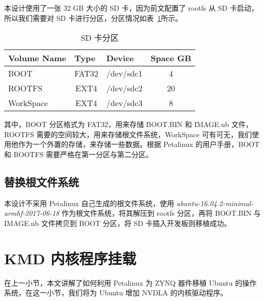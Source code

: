 本设计使用了一张 32 GB 大小的 SD 卡，因为前文配置了 rootfs 从 SD 卡启动，所以我们需要对 SD 卡进行分区，分区情况如表~\ref{tab:SD Card Partition}所示。

\begin{table}[!htbp]
    \caption{SD 卡分区}
    \label{tab:SD Card Partition}
    \centering
    \footnotesize%
    \setlength{\tabcolsep}{4pt}%
    \renewcommand{\arraystretch}{1.2}%
    \begin{tabular}{lccc}
        \toprule
        \textbf{Volume Name} & \multicolumn{1}{l}{\textbf{Type}} & \multicolumn{1}{l}{\textbf{Device}} & \multicolumn{1}{l}{\textbf{Space GB}} \\
        \midrule
        BOOT                 & FAT32                             & /dev/sdc1                                & 4                                \\
        ROOTFS               & EXT4                              & /dev/sdc2                                & 20                               \\
        WorkSpace            & EXT4                              & /dev/sdc3                                & 8                                \\
        \bottomrule                   
    \end{tabular}
\end{table}

其中，BOOT 分区格式为 FAT32，用来存储 BOOT.BIN 和 IMAGE.ub 文件，ROOTFS 需要的空间较大，用来存储根文件系统，WorkSpace 可有可无，我们使用他作为一个外置的存储，来存储一些数据。根据 Petalinux 的用户手册，BOOT 和 ROOTFS 需要严格在第一分区与第二分区。

\subsection{替换根文件系统}

本设计不采用 Petalinux 自己生成的根文件系统，使用 \emph{ubuntu-16.04.2-minimal-armhf-2017-06-18} 作为根文件系统，将其解压到 rootfs 分区，再将 BOOT.BIN 与 IMAGE.ub 文件拷贝到 BOOT 分区，将 SD 卡插入开发板则移植成功。

\section{KMD 内核程序挂载}

在上一小节，本文讲解了如何利用 Petalinux 为 ZYNQ 器件移植 Ubuntu 的操作系统，在这一小节，我们将为 Ubuntu 增加 NVDLA 的内核驱动程序。

